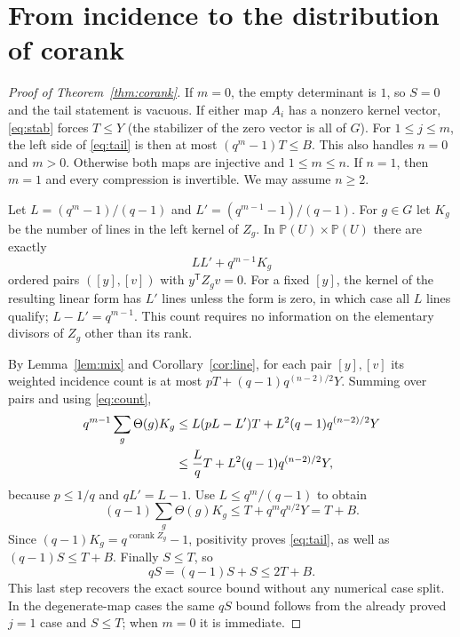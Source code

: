 \documentclass[11pt]{article}
\theoremstyle{remark}\newtheorem{remark}[theorem]{Remark}
\newcommand{\Pj}{\mathbb P}
\newcommand{\wt}{\Theta}
\begin{document}
\section{From incidence to the distribution of corank}
\begin{proof}[Proof of Theorem~\ref{thm:corank}]
If $m=0$, the empty determinant is $1$, so $S=0$ and the tail statement is vacuous. If either map $A_i$ has a nonzero kernel vector, \eqref{eq:stab} forces $T\le Y$ (the stabilizer of the zero vector is all of $G$). For $1\le j\le m$, the left side of \eqref{eq:tail} is then at most $(q^m-1)T\le B$. This also handles $n=0$ and $m>0$. Otherwise both maps are injective and $1\le m\le n$. If $n=1$, then $m=1$ and every compression is invertible. We may assume $n\ge2$.

Let $L=(q^m-1)/(q-1)$ and $L'=(q^{m-1}-1)/(q-1)$. For $g\in G$ let $K_g$ be the number of lines in the left kernel of $Z_g$. In $\Pj(U)\times\Pj(U)$ there are exactly
\begin{equation}\label{eq:count}
 L L'+q^{m-1}K_g
\end{equation}
ordered pairs $([y],[v])$ with $y^{\mathsf T}Z_gv=0$. For a fixed $[y]$, the kernel of the resulting linear form has $L'$ lines unless the form is zero, in which case all $L$ lines qualify; $L-L'=q^{m-1}$. This count requires no information on the elementary divisors of $Z_g$ other than its rank.

By Lemma~\ref{lem:mix} and Corollary~\ref{cor:line}, for each pair $[y],[v]$ its weighted incidence count is at most $pT+(q-1)q^{(n-2)/2}Y$. Summing over pairs and using \eqref{eq:count},
\begin{align}
 q^{m-1}\sum_g\wt(g)K_g
 &\le L(pL-L')T+L^2(q-1)q^{(n-2)/2}Y\label{eq:exact}\\
 &\le \frac Lq T+L^2(q-1)q^{(n-2)/2}Y,\notag
\end{align}
because $p\le1/q$ and $qL'=L-1$. Use $L\le q^m/(q-1)$ to obtain
\begin{equation}\label{eq:moment}
 (q-1)\sum_g\wt(g)K_g\le T+q^m q^{n/2}Y=T+B.
\end{equation}
Since $(q-1)K_g=q^{\operatorname{corank}Z_g}-1$, positivity proves \eqref{eq:tail}, as well as $(q-1)S\le T+B$. Finally $S\le T$, so
\[
 qS=(q-1)S+S\le 2T+B.
\]
This last step recovers the exact source bound without any numerical case split. In the degenerate-map cases the same $qS$ bound follows from the already proved $j=1$ case and $S\le T$; when $m=0$ it is immediate.
\end{proof}
\end{document}
